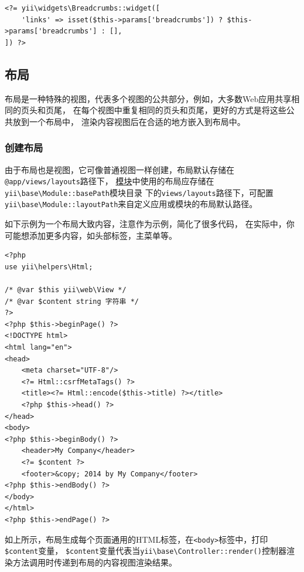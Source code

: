 \lstset{language=php}\begin{lstlisting}
<?= yii\widgets\Breadcrumbs::widget([
    'links' => isset($this->params['breadcrumbs']) ? $this->params['breadcrumbs'] : [],
]) ?>
\end{lstlisting}
\subsection{布局 \label{structure-views.md::layouts}}
布局是一种特殊的视图，代表多个视图的公共部分，例如，大多数Web应用共享相同的页头和页尾，
在每个视图中重复相同的页头和页尾，更好的方式是将这些公共放到一个布局中，
渲染内容视图后在合适的地方嵌入到布局中。

\subsubsection{创建布局 \label{structure-views.md::creating-layouts}}
由于布局也是视图，它可像普通视图一样创建，布局默认存储在\lstinline|@app/views/layouts|路径下，
\hyperref[structure-modules.md]{模块}中使用的布局应存储在\texttt{yii{\allowbreak{}\textbackslash}base{\allowbreak{}\textbackslash}Module\allowbreak{}::\allowbreak{}basePath}模块目录
下的\lstinline|views/layouts|路径下，可配置\texttt{yii{\allowbreak{}\textbackslash}base{\allowbreak{}\textbackslash}Module\allowbreak{}::\allowbreak{}layoutPath}来自定义应用或模块的布局默认路径。

如下示例为一个布局大致内容，注意作为示例，简化了很多代码，
在实际中，你可能想添加更多内容，如头部标签，主菜单等。

\lstset{language=php}\begin{lstlisting}
<?php
use yii\helpers\Html;

/* @var $this yii\web\View */
/* @var $content string 字符串 */
?>
<?php $this->beginPage() ?>
<!DOCTYPE html>
<html lang="en">
<head>
    <meta charset="UTF-8"/>
    <?= Html::csrfMetaTags() ?>
    <title><?= Html::encode($this->title) ?></title>
    <?php $this->head() ?>
</head>
<body>
<?php $this->beginBody() ?>
    <header>My Company</header>
    <?= $content ?>
    <footer>&copy; 2014 by My Company</footer>
<?php $this->endBody() ?>
</body>
</html>
<?php $this->endPage() ?>
\end{lstlisting}
如上所示，布局生成每个页面通用的HTML标签，在\lstinline|<body>|标签中，打印\lstinline|$content|变量，
\lstinline|$content|变量代表当\texttt{yii{\allowbreak{}\textbackslash}base{\allowbreak{}\textbackslash}Controller\allowbreak{}::\allowbreak{}render()}控制器渲染方法调用时传递到布局的内容视图渲染结果。

